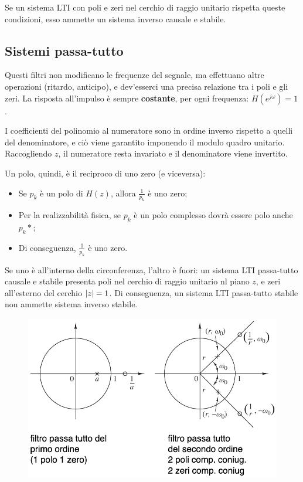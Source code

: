 Se un sistema LTI con poli e zeri nel cerchio di raggio unitario rispetta queste condizioni, esso ammette un sistema inverso causale e stabile.

\subsection{Sistemi passa-tutto}
Questi filtri non modificano le frequenze del segnale, ma effettuano altre operazioni (ritardo, anticipo), e dev'esserci una precisa relazione tra i poli e gli zeri. La risposta all'impulso è sempre \textbf{costante}, per ogni frequenza: $H(e^{j\omega}) = 1$.

I coefficienti del polinomio al numeratore sono in ordine inverso rispetto a quelli del denominatore, e ciò viene garantito imponendo il modulo quadro unitario. Raccogliendo $z$, il numeratore resta invariato e il denominatore viene invertito. 

Un polo, quindi, è il reciproco di uno zero (e viceversa):
\begin{itemize}
	\item Se $p_k$ è un polo di $H(z)$, allora $\frac{1}{p_k}$ è uno zero;
	\item Per la realizzabilità fisica, se $p_k$ è un polo complesso dovrà essere polo anche $p_k*$;
	\item Di conseguenza, $\frac{1}{p_k}$ è uno zero.
\end{itemize}

Se uno è all'interno della circonferenza, l'altro è fuori: un sistema LTI passa-tutto causale e stabile presenta poli nel cerchio di raggio unitario nl piano $z$, e zeri all'esterno del cerchio $\left|z\right| = 1$. Di conseguenza, un sistema LTI passa-tutto stabile non ammette sistema inverso stabile.

\begin{figure}[h]
	\centering
	\includegraphics[scale=0.4]{Lezioni/Immagini/passatutto}
\end{figure}


